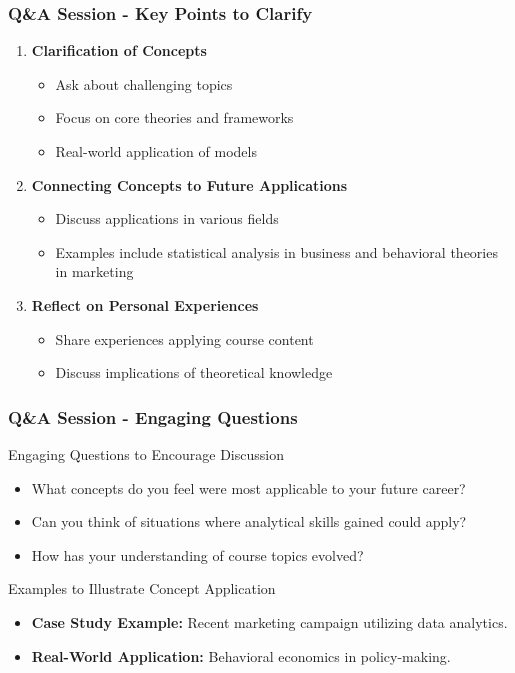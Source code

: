 \documentclass[aspectratio=169]{beamer}
\begin{document}
\begin{frame}[fragile]
    \frametitle{Q\&A Session - Key Points to Clarify}
    \begin{enumerate}
        \item \textbf{Clarification of Concepts}
        \begin{itemize}
            \item Ask about challenging topics
            \item Focus on core theories and frameworks
            \item Real-world application of models
        \end{itemize}
        
        \item \textbf{Connecting Concepts to Future Applications}
        \begin{itemize}
            \item Discuss applications in various fields
            \item Examples include statistical analysis in business and behavioral theories in marketing
        \end{itemize}
        
        \item \textbf{Reflect on Personal Experiences}
        \begin{itemize}
            \item Share experiences applying course content
            \item Discuss implications of theoretical knowledge
        \end{itemize}
    \end{enumerate}
\end{frame}

\begin{frame}[fragile]
    \frametitle{Q\&A Session - Engaging Questions}
    \begin{block}{Engaging Questions to Encourage Discussion}
        \begin{itemize}
            \item What concepts do you feel were most applicable to your future career?
            \item Can you think of situations where analytical skills gained could apply?
            \item How has your understanding of course topics evolved?
        \end{itemize}
    \end{block}
    
    \begin{block}{Examples to Illustrate Concept Application}
        \begin{itemize}
            \item \textbf{Case Study Example:} Recent marketing campaign utilizing data analytics.
            \item \textbf{Real-World Application:} Behavioral economics in policy-making.
        \end{itemize}
    \end{block}
\end{frame}
\end{document}
